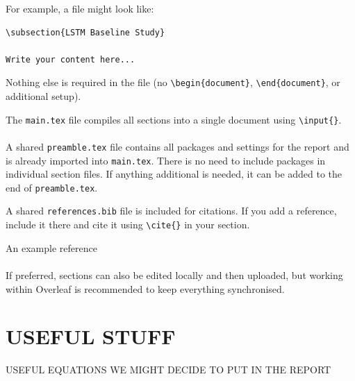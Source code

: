 \documentclass[runningheads,oneside]{llncs}
\begin{document}
For example, a file might look like:

\begin{verbatim}
\subsection{LSTM Baseline Study}

Write your content here...
\end{verbatim}

Nothing else is required in the file (no \texttt{\textbackslash begin\{document\}}, \texttt{\textbackslash end\{document\}}, or additional setup).

The \texttt{main.tex} file compiles all sections into a single document using \texttt{\textbackslash input\{\}}.

\paragraph{}

A shared \texttt{preamble.tex} file contains all packages and settings for the report and is already imported into \texttt{main.tex}. There is no need to include packages in individual section files. If anything additional is needed, it can be added to the end of \texttt{preamble.tex}.

A shared \texttt{references.bib} file is included for citations. If you add a reference, include it there and cite it using \texttt{\textbackslash cite\{\}} in your section.

An example reference \cite{makridakis2022m5}

\paragraph{}

If preferred, sections can also be edited locally and then uploaded, but working within Overleaf is recommended to keep everything synchronised.


\begin{center}
\end{center}

\newpage

\section{USEFUL STUFF}
USEFUL EQUATIONS WE MIGHT DECIDE TO PUT IN THE REPORT
\end{document}
